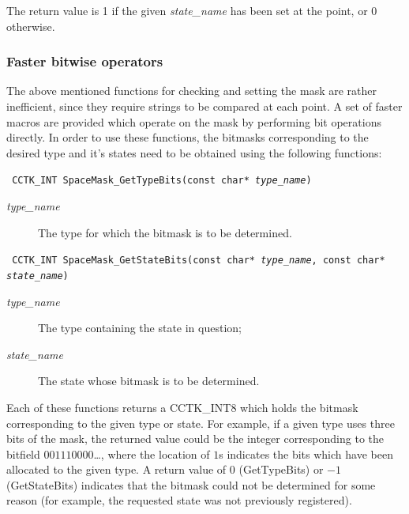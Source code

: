 \documentclass{article}
\begin{document}
The return value is 1 if the given \emph{state\_name} has been set at
the point, or 0 otherwise.

\subsubsection{Faster bitwise operators}

The above mentioned functions for checking and setting the mask are
rather inefficient, since they require strings to be compared at each
point. A set of faster macros are provided which operate on the mask
by performing bit operations directly. In order to use these
functions, the bitmasks corresponding to the desired type and it's
states need to be obtained using the following functions:

\indent\parbox{\linewidth}{
\vspace{\baselineskip}\noindent\texttt{
CCTK\_INT SpaceMask\_GetTypeBits(const char* \emph{type\_name})
}\\
\hspace*{10mm}\parbox{\linewidth}{
\begin{description}
  \item[\emph{type\_name}] The type for which the bitmask is to be
  determined.
\end{description}
}}

\indent\parbox{\linewidth}{
\vspace{\baselineskip}\noindent\texttt{
CCTK\_INT SpaceMask\_GetStateBits(const char* \emph{type\_name},
  const char* \emph{state\_name})
}
\hspace*{10mm}\parbox{\linewidth}{
\begin{description}
  \item[\emph{type\_name}] The type containing the state in question;
  \item[\emph{state\_name}] The state whose bitmask is to be determined.
\end{description}
}}

\noindent Each of these functions returns a CCTK\_INT8 which holds the
bitmask corresponding to the given type or state. For example, if a
given type uses three bits of the mask, the returned value could be
the integer corresponding to the bitfield $001110000$\ldots, where the
location of $1$s indicates the bits which have been allocated to the
given type. A return value of $0$ (GetTypeBits) or $-1$ (GetStateBits)
indicates that the bitmask could
not be determined for some reason (for example, the requested state
was not previously registered).
\end{document}
